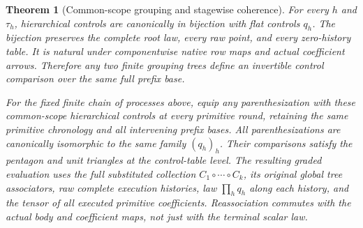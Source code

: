\documentclass[11pt]{article}
\newtheorem{theorem}{Theorem}\newtheorem{proposition}[theorem]{Proposition}
\begin{document}
\begin{theorem}[Common-scope grouping and stagewise coherence]
For every $h$ and $\tau_h$, hierarchical controls are canonically in bijection with flat controls $q_h$. The bijection preserves the complete root law, every raw point, and every zero-history table. It is natural under componentwise native row maps and actual coefficient arrows. Therefore any two finite grouping trees define an invertible control comparison over the \emph{same full prefix base}.

For the fixed finite chain of processes above, equip any parenthesization with these common-scope hierarchical controls at every primitive round, retaining the same primitive chronology and all intervening prefix bases. All parenthesizations are canonically isomorphic to the same family $(q_h)_h$. Their comparisons satisfy the pentagon and unit triangles at the control-table level. The resulting graded evaluation uses the full substituted collection $C_1\circ\cdots\circ C_k$, its original global tree associators, raw complete execution histories, law $\prod_h q_h$ along each history, and the tensor of all executed primitive coefficients. Reassociation commutes with the actual body and coefficient maps, not just with the terminal scalar law.
\end{theorem}
\end{document}
